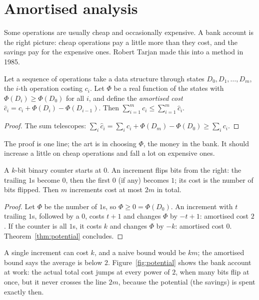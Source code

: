 \section{Amortised analysis}\label{sec:amortised}

Some operations are usually cheap and occasionally expensive. A bank account is the right picture: cheap operations pay a little
more than they cost, and the savings pay for the expensive ones. Robert Tarjan made this into a method in 1985.

\begin{theorem}\label{thm:potential}
Let a sequence of operations take a data structure through states $D_0,D_1,\dots,D_m$, the $i$-th operation costing $c_i$. Let $\Phi$
be a real function of the states with $\Phi(D_i)\ge\Phi(D_0)$ for all $i$, and define the \emph{amortised cost} $\hat c_i=c_i+\Phi(D_i)-\Phi(D_{i-1})$.
Then $\sum_{i=1}^mc_i\le\sum_{i=1}^m\hat c_i$.
\end{theorem}
\begin{proof}
The sum telescopes: $\sum_i\hat c_i=\sum_ic_i+\Phi(D_m)-\Phi(D_0)\ge\sum_ic_i$.
\end{proof}

The proof is one line; the art is in choosing $\Phi$, the money in the bank. It should increase a little on cheap operations and fall a
lot on expensive ones.

\begin{proposition}\label{prop:counter}
A $k$-bit binary counter starts at $0$. An increment flips bits from the right: the trailing $1$s become $0$, then the first $0$ (if any)
becomes $1$; its cost is the number of bits flipped. Then $m$ increments cost at most $2m$ in total.
\end{proposition}
\begin{proof}
Let $\Phi$ be the number of $1$s, so $\Phi\ge0=\Phi(D_0)$. An increment with $t$ trailing $1$s, followed by a $0$, costs $t+1$ and
changes $\Phi$ by $-t+1$: amortised cost $2$. If the counter is all $1$s, it costs $k$ and changes $\Phi$ by $-k$: amortised cost $0$.
Theorem~\ref{thm:potential} concludes.
\end{proof}

A single increment can cost $k$, and a naive bound would be $km$; the amortised bound says the average is below $2$. Figure~\ref{fig:potential} shows the
bank account at work: the actual total cost jumps at every power of $2$, when many bits flip at once, but it never crosses the line $2m$,
because the potential (the savings) is spent exactly then.


